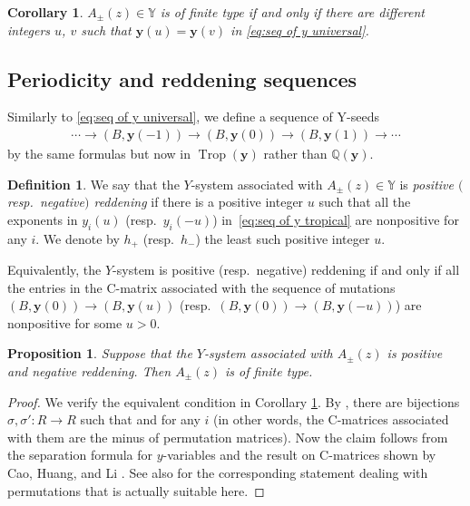 \documentclass[10pt,a4paper]{amsart}
\numberwithin{equation}{section}
\newtheorem{Corollary}[Theorem]{Corollary}
\newtheorem{Proposition}[Theorem]{Proposition}
\theoremstyle{definition}
\newtheorem{Definition}[Theorem]{Definition}
\DeclareMathOperator{\Trop}{Trop}
\begin{document}
\begin{Corollary}\label{cor:finite iff periodic for universal y}
 $A_{\pm} (z) \in \mathbb{Y}$ is of finite type if and only if there are different integers $u$, $v$ such that
 $\boldsymbol{y}(u) = \boldsymbol{y} (v)$ in \eqref{eq:seq of y universal}.
\end{Corollary}

\subsection{Periodicity and reddening sequences}
Similarly to \eqref{eq:seq of y universal}, we define a sequence of Y-seeds
\begin{align}\label{eq:seq of y tropical}
 \cdots \to (B, \boldsymbol{y}(-1)) \to (B, \boldsymbol{y}(0)) \to (B, \boldsymbol{y}(1)) \to \cdots
\end{align}
by the same formulas but now in $\Trop(\boldsymbol{y})$ rather than $\mathbb{Q}(\boldsymbol{y})$.

\begin{Definition}
 We say that the $Y$-system associated with $A_\pm (z) \in \mathbb{Y}$ is \emph{positive $($resp.\ negative$)$ reddening} if
 there is a positive integer $u$ such that
 all the exponents in $y_i(u)$ (resp.\ $y_i(-u)$) in~\eqref{eq:seq of y tropical} are nonpositive for any $i$.
 We denote by $h_+$ (resp.\ $h_-$) the least such positive integer $u$.
\end{Definition}

Equivalently, the $Y$-system is positive (resp.\ negative) reddening if and only if all the entries in the
C-matrix associated with the sequence of mutations
$(B, \boldsymbol{y}(0)) \to (B, \boldsymbol{y}(u))$
(resp.\ $(B, \boldsymbol{y}(0)) \to (B, \boldsymbol{y}(-u))$)
are nonpositive for some $u>0$.

\begin{Proposition}\label{prop:fin type of reddening}
 Suppose that the $Y$-system associated with $A_\pm (z)$ is positive and negative reddening.
 Then $A_\pm (z)$ is of finite type.
\end{Proposition}
\begin{proof}
 We verify the equivalent condition in Corollary \ref{cor:finite iff periodic for universal y}.
 By \cite[Proposition 2.10]{BDP},
 there are bijections $\sigma, \sigma' \colon R \to R$ such that
  and  for any $i$
 (in other words, the C-matrices associated with them are the minus of permutation matrices).
 Now the claim follows from the separation formula for $y$-variables \cite[Proposition 3.13]{FZ4} and
 the result on C-matrices shown by Cao, Huang, and Li \cite[Theorem 2.5]{CHL20}.
 See also \cite[Theorem 5.2]{nakanishi2019synchronicity} for the corresponding statement dealing with permutations
 that is actually suitable here.
\end{proof}
\end{document}
